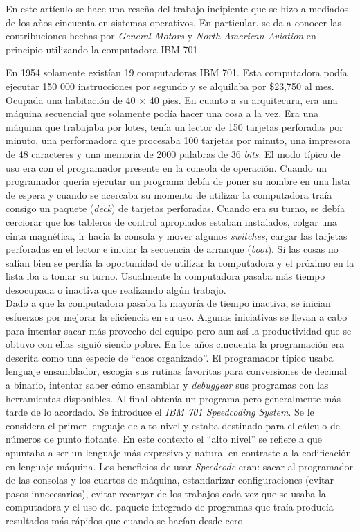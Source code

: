 En este artículo se hace una reseña del trabajo incipiente que se hizo a mediados de los años cincuenta en sistemas operativos. En particular, se da a conocer las contribuciones hechas por \textit{General Motors} y \textit{North American Aviation} en principio utilizando la computadora \textsc{IBM 701}.

En 1954 solamente existían 19 computadoras \textsc{IBM 701}. Esta computadora podía ejecutar 150 000 instrucciones por segundo y se alquilaba por \$23,750 al mes. Ocupada una habitación de 40 $\times$ 40 pies. En cuanto a su arquitecura, era una máquina secuencial que solamente podía hacer una cosa a la vez. Era una máquina que trabajaba por lotes, tenía un lector de 150 tarjetas perforadas por minuto, una performadora que procesaba 100 tarjetas por minuto, una impresora de 48 caracteres y una memoria de 2000 palabras de 36 \textit{bits}. El modo típico de uso era con el programador presente en la consola de operación. Cuando un programador quería ejecutar un programa debía de poner su nombre en una lista de espera y cuando se acercaba su momento de utilizar la computadora traía consigo un paquete (\textit{deck}) de tarjetas perforadas. Cuando era su turno, se debía cerciorar que los tableros de control apropiados estaban instalados, colgar una cinta magnética, ir hacia la consola y mover algunos \textit{switches}, cargar las tarjetas perforadas en el lector e iniciar la secuencia de arranque (\textit{boot}). Si las cosas no salían bien se perdía la oportunidad de utilizar la computadora y el próximo en la lista iba a tomar su turno. Usualmente la computadora pasaba más tiempo desocupada o inactiva que realizando algún trabajo.\\

Dado a que la computadora pasaba la mayoría de tiempo inactiva, se inician esfuerzos por mejorar la eficiencia en su uso. Algunas iniciativas se llevan a cabo para intentar sacar más provecho del equipo pero aun así la productividad que se obtuvo con ellas siguió siendo pobre. En los años cincuenta la programación era descrita como una especie de ``caos organizado''. El programador típico usaba lenguaje ensamblador, escogía sus rutinas favoritas para conversiones de decimal a binario, intentar saber cómo ensamblar y \textit{debuggear} sus programas con las herramientas disponibles. Al final obtenía un programa pero generalmente más tarde de lo acordado. Se introduce el \textit{IBM 701 Speedcoding System}. Se le considera el primer lenguaje de alto nivel y estaba destinado para el cálculo de números de punto flotante. En este contexto el ``alto nivel'' se refiere a que apuntaba a ser un lenguaje más expresivo y natural en contraste a la codificación en lenguaje máquina. Los beneficios de usar \textit{Speedcode} eran: sacar al programador de las consolas y los cuartos de máquina, estandarizar configuraciones (evitar pasos innecesarios), evitar recargar de los trabajos cada vez que se usaba la computadora y el uso del paquete integrado de programas que traía producía resultados más rápidos que cuando se hacían desde cero.


